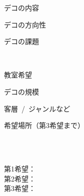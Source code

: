 \documentclass[paper=b4j, landscape, fleqn, jafontsize=9pt, jafontscale=1, head_space=25.5mm, foot_space=15mm, fore-edge=14.5mm, gutter=14.5mm, hanging_punctuation, baselineskip=7mm]{jlreq}
\begin{document}
\begin{answersheetb4}
\groupinfo


\begin{question}{デコの内容}
\begin{enumbracketsans}
    \item デコの方向性
    \item デコの課題
\end{enumbracketsans}
\end{question}
\begin{answer}
    \\
    \vskip0mm
\end{answer}

\vfill

\newcolumn
\begin{question}{教室希望}
    \begin{enumbracketsans}
        \item デコの規模
        \item 客層~/~ジャンルなど
        \item 希望場所（第3希望まで）
    \end{enumbracketsans}
\end{question}
\begin{answer}
    \begin{enumbracketsans}
        \item \kasen{}
        \item \kasen{}\\\noindent\kasen{}\\\noindent\kasen{}
        \item 第1希望：\kasen[width=100mm]{}\\\noindent 第2希望：\kasen[width=100mm]{}\\\noindent 第3希望：\kasen[width=100mm]{}
    \end{enumbracketsans}
\end{answer}

\checkcolumn

\finalcheck

\end{answersheetb4}
\end{document}
